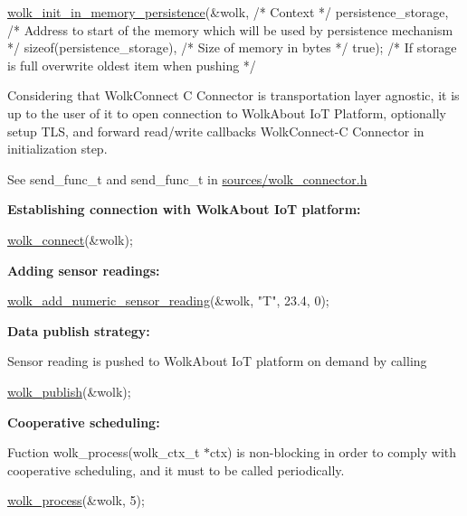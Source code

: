 \begin{DoxyCode}
\hyperlink{wolk__connector_8h_a0fbb983c6b65072501b078ba6ff8e5ad}{wolk\_init\_in\_memory\_persistence}(&wolk,                       \textcolor{comment}{/* Context */}
                                persistence\_storage,         \textcolor{comment}{/* Address to start of the memory which will
       be used by persistence mechanism */}
                                \textcolor{keyword}{sizeof}(persistence\_storage), \textcolor{comment}{/* Size of memory in bytes */}
                                \textcolor{keyword}{true});                       \textcolor{comment}{/* If storage is full overwrite oldest item
       when pushing */}
\end{DoxyCode}
 Considering that Wolk\+Connect C Connector is transportation layer agnostic, it is up to the user of it to open connection to Wolk\+About IoT Platform, optionally setup T\+LS, and forward read/write callbacks Wolk\+Connect-\/C Connector in initialization step.

See {\ttfamily send\+\_\+func\+\_\+t} and {\ttfamily send\+\_\+func\+\_\+t} in {\ttfamily \hyperlink{wolk__connector_8h}{sources/wolk\+\_\+connector.\+h}}

{\bfseries Establishing connection with Wolk\+About IoT platform\+:} 
\begin{DoxyCode}
\hyperlink{wolk__connector_8h_ab246fad03ad57f3efe89f4ec2c93a288}{wolk\_connect}(&wolk);
\end{DoxyCode}
 {\bfseries Adding sensor readings\+:} 
\begin{DoxyCode}
\hyperlink{wolk__connector_8h_ab7bcc53c7c06a6cc2b8db5190b1af70f}{wolk\_add\_numeric\_sensor\_reading}(&wolk, \textcolor{stringliteral}{"T"}, 23.4, 0);
\end{DoxyCode}
 {\bfseries Data publish strategy\+:}

Sensor reading is pushed to Wolk\+About IoT platform on demand by calling 
\begin{DoxyCode}
\hyperlink{wolk__connector_8h_ac5e7ddb346ea4b9a7cc4511d3728be09}{wolk\_publish}(&wolk);
\end{DoxyCode}


{\bfseries Cooperative scheduling\+:}

Fuction {\ttfamily wolk\+\_\+process(wolk\+\_\+ctx\+\_\+t $\ast$ctx)} is non-\/blocking in order to comply with cooperative scheduling, and it must to be called periodically.


\begin{DoxyCode}
\hyperlink{wolk__connector_8h_a57a05d76cc96bc5de0ee0e9a23ca5a8e}{wolk\_process}(&wolk, 5);
\end{DoxyCode}


